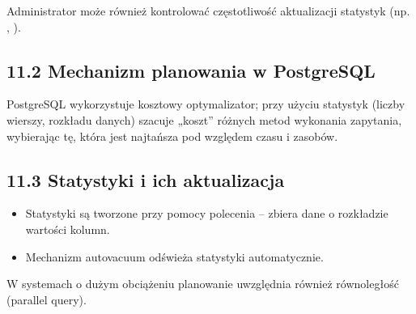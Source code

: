 \documentclass[a4paper,11pt,polish]{sphinxmanual}
\begin{document}
\sphinxAtStartPar
Administrator może również kontrolować częstotliwość aktualizacji statystyk (np. , ).


\subsection{11.2 Mechanizm planowania w PostgreSQL}
\label{\detokenize{Konfiguracja_baz_danych/Konfiguracja_baz_danych:mechanizm-planowania-w-postgresql}}
\sphinxAtStartPar
PostgreSQL wykorzystuje kosztowy optymalizator; przy użyciu statystyk (liczby wierszy, rozkładu danych) szacuje „koszt” różnych metod wykonania zapytania, wybierając tę, która jest najtańsza pod względem czasu i zasobów.


\subsection{11.3 Statystyki i ich aktualizacja}
\label{\detokenize{Konfiguracja_baz_danych/Konfiguracja_baz_danych:statystyki-i-ich-aktualizacja}}\begin{itemize}
\item {} 
\sphinxAtStartPar
Statystyki są tworzone przy pomocy polecenia  – zbiera dane o rozkładzie wartości kolumn.

\item {} 
\sphinxAtStartPar
Mechanizm autovacuum odświeża statystyki automatycznie.

\end{itemize}

\sphinxAtStartPar
{}

\begin{sphinxVerbatim}[commandchars=\\\{\}]
 \PYG{p}{[}\PYG{p}{]}
\end{sphinxVerbatim}

\sphinxAtStartPar
W systemach o dużym obciążeniu planowanie uwzględnia również równoległość (parallel query).
\end{document}
